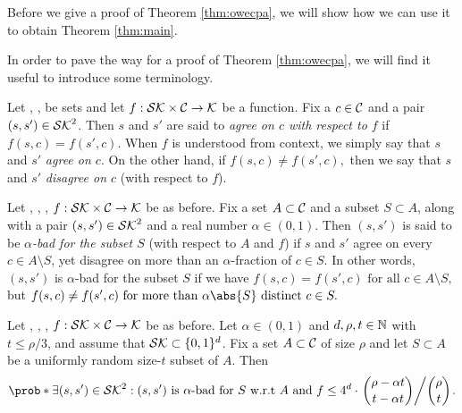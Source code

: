 Before we give a proof of Theorem \ref{thm:owecpa},
we will show how we can use it to obtain Theorem \ref{thm:main}.

In order to pave the way for a proof of Theorem \ref{thm:owecpa},
we will find it useful to introduce some terminology.

\begin{definition}\label{def:agree}
  Let \setSK, \setC, \keyspace be sets and
  let \(f : \mathcal{SK} \times \mathcal{C} \to \mathcal{K}\) be a function.
  Fix a \(c \in \mathcal{C}\) and a pair \((s,s') \in \mathcal{SK}^{2}\).
  Then \(s\) and \(s'\) are said to \emph{agree on \(c\) with respect to \(f\)} if
  \(
    f(s,c) = f(s',c).
  \)
  When \(f\) is understood from context, we simply say that \(s\) and \(s'\) \emph{agree on \(c\)}.
  On the other hand, if
  \(
    f(s,c) \ne f(s',c),
  \)
  then we say that \(s\) and \(s'\) \emph{disagree on \(c\)} (with respect to \(f\)).
\end{definition}


\begin{definition}\label{def:bad}
  Let \setSK, \setC, \keyspace, \(f : \mathcal{SK} \times \mathcal{C} \to \mathcal{K}\) be as before.
  Fix a set \(A \subset \mathcal{C}\) and a subset \(S \subset A\),
  along with a pair \((s,s') \in \mathcal{SK}^{2}\) and a real number \(\alpha \in (0,1)\).
  Then \((s,s')\) is said to be \emph{\(\alpha\)-bad for the subset \(S\)} (with respect to \(A\) and \(f\)) if
  \(s\) and \(s'\) agree on every \(c \in A \setminus S\), yet disagree on more than an \(\alpha\)-fraction of \(c \in S\).
  In other words, \((s,s')\) is \(\alpha\)-bad for the subset \(S\) if we have
  \(
    f(s,c) = f(s',c) \text{ for all } c \in A \setminus S,
  \)
  but
  \(
    f(s,c) \ne f(s',c) \text{ for more than } \alpha \abs{S} \text{ distinct } c \in S.
  \)
\end{definition}


\begin{lemma}\label{lemma:equiv}
  Let \setSK, \setC, \keyspace, \(f : \mathcal{SK} \times \mathcal{C} \to \mathcal{K}\) be as before.
  Let \(\alpha \in (0,1)\) and \(d,\rho,t \in \mathbb{N}\) with \(t \le \rho/3\),
  and assume that \(\mathcal{SK} \subset \{0,1\}^{d}\).
  Fix a set \(A \subset \mathcal{C}\) of size \(\rho\)
  and let \(S \subset A\) be a uniformly random size-\(t\) subset of \(A\).
  Then
  \begin{align}\label{ineq:equiv}
    \prob*{\exists (s,s') \in \setSK^{2} : (s,s') \text{ is \(\alpha\)-bad for } S \text{ w.r.t \(A\) and \(f\)}}
    \le 4^{d} \cdot \left. \binom{\rho - \alpha t}{t - \alpha t} \middle/ \binom{\rho}{t} \right..
  \end{align}
\end{lemma}

